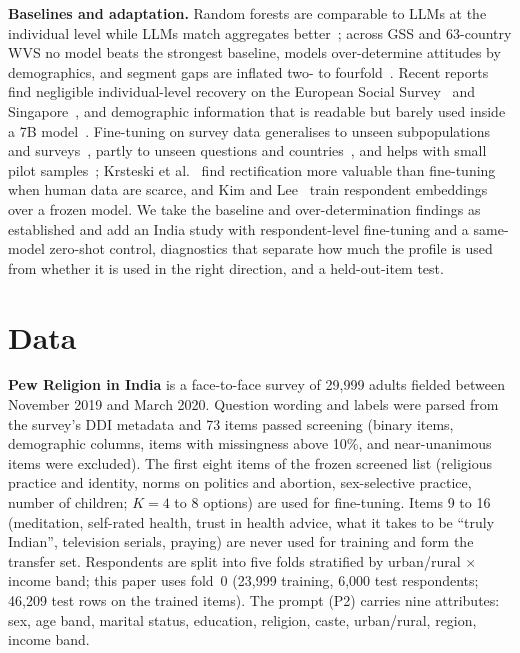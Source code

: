 \documentclass[conference]{IEEEtran}
\begin{document}
\textbf{Baselines and adaptation.} Random forests are comparable to LLMs at the individual level while LLMs match aggregates better~\cite{miranda2025}; across GSS and 63-country WVS no model beats the strongest baseline, models over-determine attitudes by demographics, and segment gaps are inflated two- to fourfold~\cite{chen2026}. Recent reports find negligible individual-level recovery on the European Social Survey~\cite{wang2026} and Singapore~\cite{lam2026}, and demographic information that is readable but barely used inside a 7B model~\cite{robbani2026}. Fine-tuning on survey data generalises to unseen subpopulations and surveys~\cite{suh2025}, partly to unseen questions and countries~\cite{cao2025}, and helps with small pilot samples~\cite{choi2026}; Krsteski et al.~\cite{krsteski2025} find rectification more valuable than fine-tuning when human data are scarce, and Kim and Lee~\cite{kim2023} train respondent embeddings over a frozen model. We take the baseline and over-determination findings as established and add an India study with respondent-level fine-tuning and a same-model zero-shot control, diagnostics that separate how much the profile is used from whether it is used in the right direction, and a held-out-item test.

\section{Data}

\textbf{Pew Religion in India} \cite{pew2021} is a face-to-face survey of 29{,}999 adults fielded between November 2019 and March 2020. Question wording and labels were parsed from the survey's DDI metadata and 73 items passed screening (binary items, demographic columns, items with missingness above 10\%, and near-unanimous items were excluded). The first eight items of the frozen screened list (religious practice and identity, norms on politics and abortion, sex-selective practice, number of children; $K=4$ to 8 options) are used for fine-tuning. Items 9 to 16 (meditation, self-rated health, trust in health advice, what it takes to be ``truly Indian'', television serials, praying) are never used for training and form the transfer set. Respondents are split into five folds stratified by urban/rural $\times$ income band; this paper uses fold~0 (23{,}999 training, 6{,}000 test respondents; 46{,}209 test rows on the trained items). The prompt (P2) carries nine attributes: sex, age band, marital status, education, religion, caste, urban/rural, region, income band.
\end{document}
